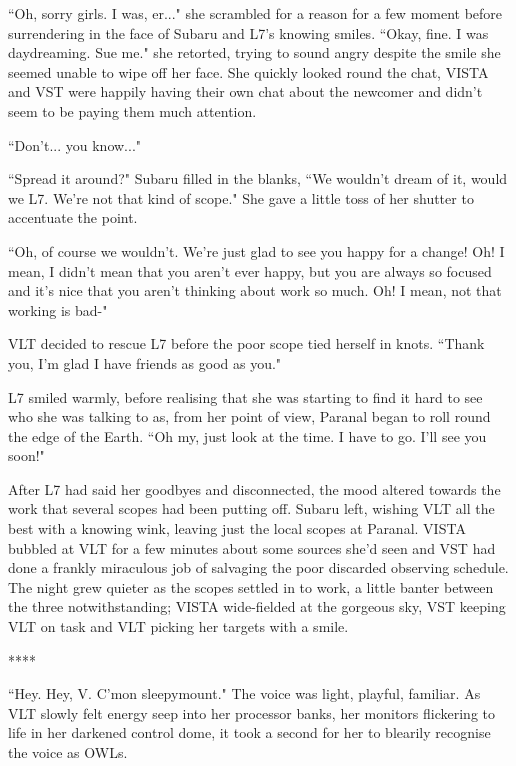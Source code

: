 \documentclass[12pt]{iopart}
\begin{document}
``Oh, sorry girls. I was, er..." she scrambled for a reason for a few moment before surrendering in the face of Subaru and L7's knowing smiles. ``Okay, fine. I was daydreaming. Sue me." she retorted, trying to sound angry despite the smile she seemed unable to wipe off her face. She quickly looked round the chat, VISTA and VST were happily having their own chat about the newcomer and didn't seem to be paying them much attention.

``Don't... you know..."

``Spread it around?" Subaru filled in the blanks, ``We wouldn't dream of it, would we L7. We're not that kind of scope." She gave a little toss of her shutter to accentuate the point.

``Oh, of course we wouldn't. We're just glad to see you happy for a change! Oh! I mean, I didn't mean that you aren't ever happy, but you are always so focused and it's nice that you aren't thinking about work so much. Oh! I mean, not that working is bad-"

VLT decided to rescue L7 before the poor scope tied herself in knots. ``Thank you, I'm glad I have friends as good as you."

L7 smiled warmly, before realising that she was starting to find it hard to see who she was talking to as, from her point of view, Paranal began to roll round the edge of the Earth. ``Oh my, just look at the time. I have to go. I'll see you soon!"

After L7 had said her goodbyes and disconnected, the mood altered towards the work that several scopes had been putting off. Subaru left, wishing VLT all the best with a knowing wink, leaving just the local scopes at Paranal. VISTA bubbled at VLT for a few minutes about some sources she'd seen and VST had done a frankly miraculous job of salvaging the poor discarded observing schedule. The night grew quieter as the scopes settled in to work, a little banter between the three notwithstanding; VISTA wide-fielded at the gorgeous sky, VST keeping VLT on task and VLT picking her targets with a smile.

\begin{center}
****
\end{center}


``Hey. Hey, V. C'mon sleepymount." The voice was light, playful, familiar. As VLT slowly felt energy seep into her processor banks, her monitors flickering to life in her darkened control dome, it took a second for her to blearily recognise the voice as OWLs. 
\end{document}
